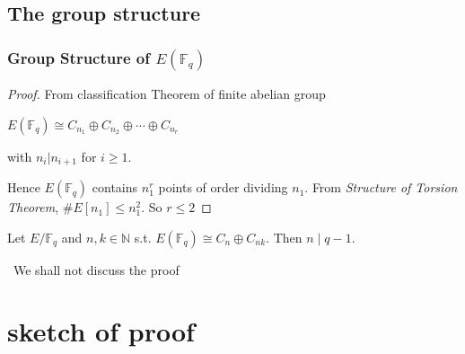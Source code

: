 \documentclass[10pt,handout]{beamer}%
\newcommand{\F}{\mathbb F}
\theoremstyle{definition}
\begin{document}
\subsection{The group structure}
\begin{frame}\frametitle{Group Structure of $E(\F_q)$}

\pause

\begin{proof}
From classification Theorem of finite abelian group\\
\centerline{$E(\F_q)\cong  C_{n_1}\oplus C_{n_2}\oplus\cdots\oplus C_{n_r}$}
with $n_i|n_{i+1}$ for $i\ge1$.\pause

Hence $E(\F_q)$ contains $n_1^r$ points of order dividing $n_1$. From
\emph{Structure of Torsion Theorem}, $\#E[n_1]\le n_1^2$.
So $r\le2$\end{proof}\pause

\begin{theorem}  Let $E/\F_q$ and $n,k\in\mathbb N$ s.t.
$E(\F_q)\cong C_n\oplus C_{nk}.$
Then $n\mid q-1$.
\end{theorem}\pause

\ \hfil We shall not discuss the proof
\end{frame}


\section{sketch of proof}
\end{document}
